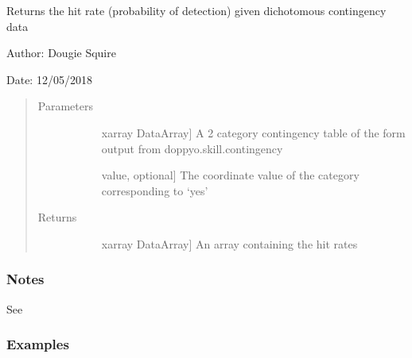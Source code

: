 \documentclass[letterpaper,10pt,english]{sphinxmanual}
\begin{document}

\begin{fulllineitems}
\label{\detokenize{skill_doc:skill.hit_rate}}
Returns the hit rate (probability of detection) given dichotomous contingency data

\begin{DUlineblock}{0em}
\item[] Author: Dougie Squire
\item[] Date: 12/05/2018
\end{DUlineblock}
\begin{quote}\begin{description}
\item[{Parameters}] \leavevmode\begin{description}
\item[{}] \leavevmode{[}xarray DataArray{]}
A 2 category contingency table of the form output from doppyo.skill.contingency

\item[{}] \leavevmode{[}value, optional{]}
The coordinate value of the category corresponding to ‘yes’

\end{description}

\item[{Returns}] \leavevmode\begin{description}
\item[{}] \leavevmode{[}xarray DataArray{]}
An array containing the hit rates

\end{description}

\end{description}\end{quote}
\subsubsection*{Notes}

See 
\subsubsection*{Examples}


\end{fulllineitems}
\end{document}
